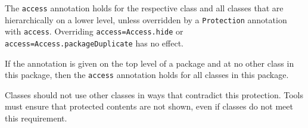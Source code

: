 The \lstinline!access! annotation holds for the respective class and all classes that are hierarchically on a lower level, unless overridden by a \lstinline!Protection! annotation with \lstinline!access!.
Overriding \lstinline!access=Access.hide! or \lstinline!access=Access.packageDuplicate! has no effect.

\begin{example}
If the annotation is given on the top level of a package and at no other class in this package, then the \lstinline!access! annotation holds for all classes in this package.
\end{example}

Classes should not use other classes in ways that contradict this protection.
Tools must ensure that protected contents are not shown, even if classes do not meet this requirement.

